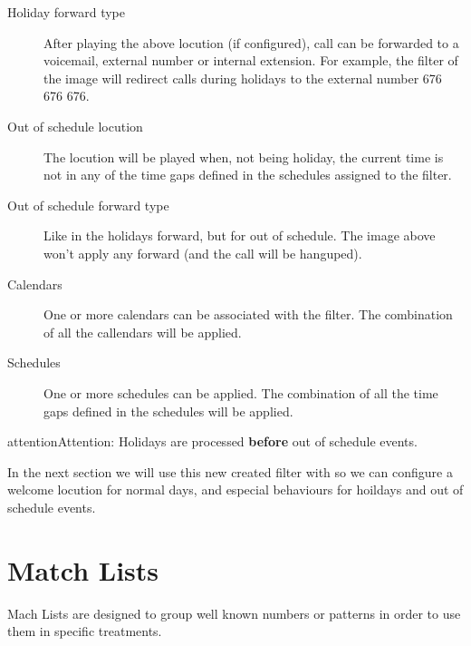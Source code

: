 \documentclass[letterpaper,10pt,english]{sphinxmanual}
\begin{document}
\begin{description}
\item[{Holiday forward type}] \leavevmode{}\label{pbx_features/external_filters:term-holiday-forward-type}
After playing the above locution (if configured), call can be forwarded
to a voicemail, external number or internal extension. For example, the
filter of the image will redirect calls during holidays to the external
number 676 676 676.

\item[{Out of schedule locution}] \leavevmode{}\label{pbx_features/external_filters:term-out-of-schedule-locution}
The locution will be played when, not being holiday, the current time
is not in any of the time gaps defined in the schedules assigned to the
filter.

\item[{Out of schedule forward type}] \leavevmode{}\label{pbx_features/external_filters:term-out-of-schedule-forward-type}
Like in the holidays forward, but for out of schedule. The image above
won't apply any forward (and the call will be hanguped).

\item[{Calendars}] \leavevmode{}\label{pbx_features/external_filters:term-calendars}
One or more calendars can be associated with the filter. The combination
of all the callendars will be applied.

\item[{Schedules}] \leavevmode{}\label{pbx_features/external_filters:term-schedules}
One or more schedules can be applied. The combination of all the time
gaps defined in the schedules will be applied.

\end{description}

\begin{notice}{attention}{Attention:}
Holidays are processed \textbf{before} out of schedule events.
\end{notice}

In the next section we will use this new created filter with
{\hyperref[pbx_features/external_ddis:external\string-ddis]{}} so we can configure a welcome locution for normal days,
and especial behaviours for hoildays and out of schedule events.


\section{Match Lists}
\label{pbx_features/match_lists:match-lists}\label{pbx_features/match_lists::doc}\label{pbx_features/match_lists:id1}
Mach Lists are designed to group well known numbers or patterns in order to use
them in specific treatments.
\end{document}
